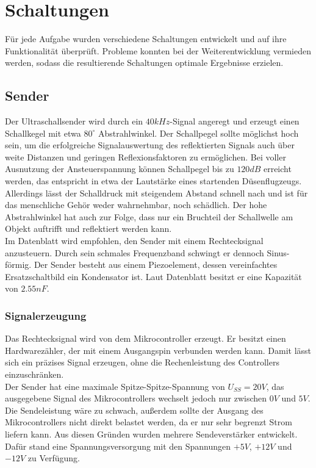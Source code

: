 
\chapter{Schaltungen}
Für jede Aufgabe wurden verschiedene Schaltungen entwickelt und auf ihre Funktionalität überprüft. Probleme konnten bei der Weiterentwicklung vermieden werden, sodass die resultierende Schaltungen optimale Ergebnisse erzielen.

\section{Sender}
Der Ultraschallsender wird durch ein $40 kHz$-Signal angeregt und erzeugt einen Schallkegel mit etwa $80^\circ$ Abstrahlwinkel. Der Schallpegel sollte möglichst hoch sein, um die erfolgreiche Signalauswertung des reflektierten Signals auch über weite Distanzen und geringen Reflexionsfaktoren zu ermöglichen. Bei voller Ausnutzung der Ansteuerspannung können Schallpegel bis zu $120dB$ erreicht werden, das entspricht in etwa der Lautstärke eines startenden Düsenflugzeugs. Allerdings lässt der Schalldruck mit steigendem Abstand schnell nach und ist für das menschliche Gehör weder wahrnehmbar, noch schädlich. Der hohe Abstrahlwinkel hat auch zur Folge, dass nur ein Bruchteil der Schallwelle am Objekt auftrifft und reflektiert werden kann.\\
Im Datenblatt wird empfohlen, den Sender mit einem Rechtecksignal anzusteuern. Durch sein schmales Frequenzband schwingt er dennoch Sinus-förmig. Der Sender besteht aus einem Piezoelement, dessen vereinfachtes Ersatzschaltbild ein Kondensator ist. Laut Datenblatt besitzt er eine Kapazität von $2.55nF$.\\


\subsection{Signalerzeugung}
Das Rechtecksignal wird von dem Mikrocontroller erzeugt. Er besitzt einen Hardwarezähler, der mit einem Ausgangspin verbunden werden kann. Damit lässt sich ein präzises Signal erzeugen, ohne die Rechenleistung des Controllers einzuschränken.\\
Der Sender hat eine maximale Spitze-Spitze-Spannung von $U_{SS} = 20V$, das ausgegebene Signal des Mikrocontrollers wechselt jedoch nur zwischen $0V$ und $5V$. Die Sendeleistung wäre zu schwach, außerdem sollte der Ausgang des Mikrocontrollers nicht direkt belastet werden, da er nur sehr begrenzt Strom liefern kann. Aus diesen Gründen wurden mehrere Sendeverstärker entwickelt. Dafür stand eine Spannungsversorgung mit den Spannungen $+5V$, $+12V$ und $-12V$ zu Verfügung.



